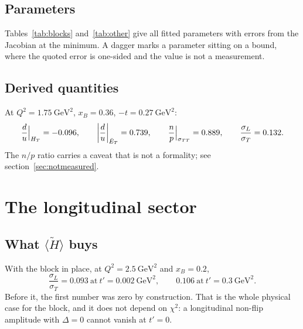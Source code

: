 \documentclass[11pt,a4paper]{article}
\newcommand{\sig}[1]{\sigma_{#1}}
\begin{document}
\subsection{Parameters}

Tables~\ref{tab:blocks} and~\ref{tab:other} give all \npar{} fitted
parameters with errors from the Jacobian at the minimum.  A dagger marks a
parameter sitting on a bound, where the quoted error is one-sided and the value
is not a measurement.

\begin{table}[htb]
\centering\small
\caption{Block parameters.  Every block is a \emph{convolution}
$\langle X\rangle$, not a GPD: no GPD is fitted anywhere in this work.
$N$ in nb$^{1/2}$/GeV, $b$ and $b'$ in GeV$^{-2}$, $n_Q$ dimensionless.}
\label{tab:blocks}

\end{table}

\begin{table}[htb]
\centering\small
\caption{Remaining parameters, with the interval each was allowed.}
\label{tab:other}

\end{table}

\subsection{Derived quantities}

At $Q^2 = 1.75\ \mathrm{GeV}^2$, $x_B = 0.36$, $-t = 0.27\ \mathrm{GeV}^2$:
\[
\frac{d}{u}\Big|_{H_T} = \rduHT, \qquad
\left|\frac{d}{u}\right|_{\bar E_T} = \rduET, \qquad
\frac{n}{p}\Big|_{\sig{TT}} = \rnoverp, \qquad
\frac{\sig{L}}{\sig{T}} = \rsigLoversigT .
\]
The $n/p$ ratio carries a caveat that is not a formality; see
section~\ref{sec:notmeasured}.

\section{The longitudinal sector}
\label{sec:longi}

\subsection{What $\langle\tilde H\rangle$ buys}

With the block in place, at $Q^2 = 2.5\ \mathrm{GeV}^2$ and $x_B = 0.2$,
\[
\frac{\sig{L}}{\sig{T}} = 0.093 \ \text{at}\ t' = 0.002\ \mathrm{GeV}^2,
\qquad 0.106 \ \text{at}\ t' = 0.3\ \mathrm{GeV}^2 .
\]
Before it, the first number was zero by construction.  That is the whole
physical case for the block, and it does not depend on $\chi^2$: a longitudinal
non-flip amplitude with $\Delta = 0$ cannot vanish at $t' = 0$.
\end{document}
